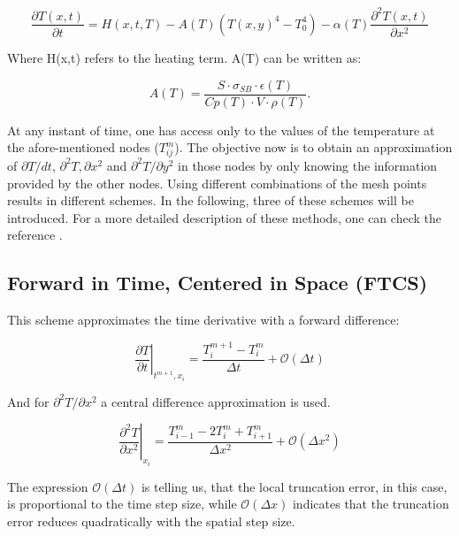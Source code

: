 \begin{equation}
    \frac{\partial T(x,t)}{\partial t} = 
        H(x,t,T)
        - A(T) \left(T(x,y)^4 - T_0^4\right)
            -\alpha (T)  \frac{\partial^2 T(x,t)}{\partial x^2}   
            \label{eq:SimpleHeating}
    \end{equation}

Where H(x,t) refers to the heating term. A(T) can be written as: 

\begin{equation}
    A(T) = \frac{S\cdot \sigma_{SB}\cdot \epsilon(T)}{Cp(T)\cdot V \cdot \rho(T)}. 
\end{equation}

At any instant of time, one has access only to the values of the temperature at the afore-mentioned nodes ($T^{m}_{ij}$). The objective now is to obtain an approximation of $\partial T/dt$, $\partial^2 T,\partial x^2$ and $\partial^2 T/\partial y^2$ in those nodes by only knowing the information provided by the other nodes. Using different combinations of the mesh points results in different schemes. In the following, three of these schemes will be introduced. For a more detailed description of these methods, one can check the reference \parencite[][]{ref:FiniteDifference}.

\subsection{Forward in Time, Centered in Space (FTCS)}

This scheme approximates the time derivative with a forward difference: 

\begin{equation}
    \left. \frac{\partial T}{\partial t}\right|_{t^{m+1},x_i}  = \frac{T^{m+1}_i - T^m_i}{\Delta t} +  \mathcal{O} \left( \Delta t \right)
 \end{equation}

And for $\partial^2 T/ \partial x^2$ a central difference approximation is used. 

\begin{equation}
    \left. \frac{\partial^2 T}{\partial x^2}\right|_{x_i} = \frac{T^{m}_{i-1}-2T^m_{i}+T^m_{i+1}}{\Delta x^2}+\mathcal{O}\left(\Delta x^2 \right)
    \label{eq:CD}
\end{equation}

The expression $\mathcal{O}(\Delta t)$ is telling us, that the local truncation error, in this case, is proportional to the time step size, while $\mathcal{O}(\Delta x)$ indicates that the truncation error reduces quadratically with the spatial step size. 

